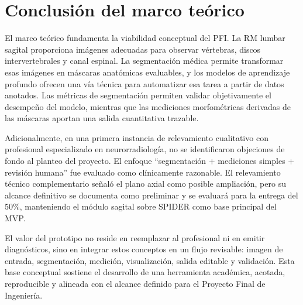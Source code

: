 \section{Conclusión del marco teórico}

El marco teórico fundamenta la viabilidad conceptual del PFI. La RM lumbar sagital proporciona imágenes adecuadas para observar vértebras, discos intervertebrales y canal espinal. La segmentación médica permite transformar esas imágenes en máscaras anatómicas evaluables, y los modelos de aprendizaje profundo ofrecen una vía técnica para automatizar esa tarea a partir de datos anotados. Las métricas de segmentación permiten validar objetivamente el desempeño del modelo, mientras que las mediciones morfométricas derivadas de las máscaras aportan una salida cuantitativa trazable.

Adicionalmente, en una primera instancia de relevamiento cualitativo con profesional especializado en neurorradiología, no se identificaron objeciones de fondo al planteo del proyecto. El enfoque ``segmentación + mediciones simples + revisión humana'' fue evaluado como clínicamente razonable. El relevamiento técnico complementario señaló el plano axial como posible ampliación, pero su alcance definitivo se documenta como preliminar y se evaluará para la entrega del 50\%, manteniendo el módulo sagital sobre SPIDER como base principal del MVP.

El valor del prototipo no reside en reemplazar al profesional ni en emitir diagnósticos, sino en integrar estos conceptos en un flujo revisable: imagen de entrada, segmentación, medición, visualización, salida editable y validación. Esta base conceptual sostiene el desarrollo de una herramienta académica, acotada, reproducible y alineada con el alcance definido para el Proyecto Final de Ingeniería.

